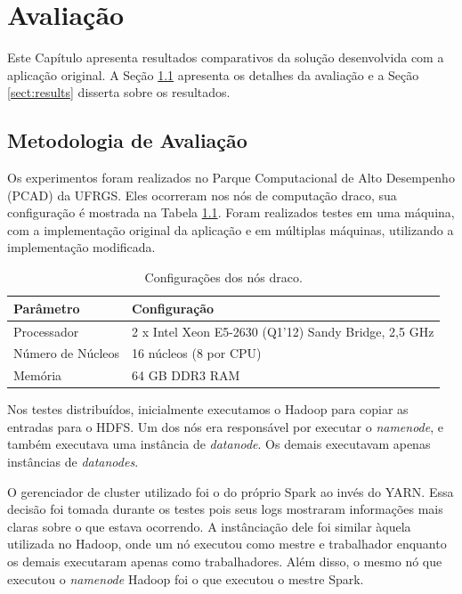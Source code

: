 \chapter{Avaliação} \label{ch:evaluation}

Este Capítulo apresenta resultados comparativos da solução desenvolvida com a 
aplicação original. A Seção \ref{sect:methodology} apresenta os detalhes da 
avaliação e a Seção \ref{sect:results} disserta sobre os resultados.


\section{Metodologia de Avaliação} \label{sect:methodology}

Os experimentos foram realizados no Parque Computacional de Alto 
Desempenho (PCAD) da UFRGS. Eles ocorreram nos nós de computação draco, sua 
configuração é mostrada na Tabela \ref{tab:draco_config}. Foram realizados 
testes em uma máquina, com a implementação original da aplicação e em múltiplas 
máquinas, utilizando a implementação modificada.

\begin{table}[H]
\centering
\begin{tabular}{l l} \toprule
\textbf{Parâmetro}  &  \textbf{Configuração} \\ 
\midrule
Processador     & 2 x Intel Xeon E5-2630 (Q1'12) Sandy Bridge, 2,5 GHz  
\\
Número de Núcleos    & 16 núcleos (8 por CPU)  \\
Memória       & 64 GB DDR3 RAM   \\
\end{tabular}
\caption{Configurações dos nós draco.}
\label{tab:draco_config}
\end{table}


Nos testes distribuídos, inicialmente executamos o Hadoop para copiar as 
entradas para o HDFS. Um dos nós era responsável por executar o \emph{namenode}, 
e também executava uma instância de \emph{datanode}. Os demais executavam apenas 
instâncias de \emph{datanodes}.

O gerenciador de cluster utilizado foi o do próprio Spark ao invés do YARN. 
Essa decisão foi tomada durante os testes pois seus logs mostraram 
informações mais claras sobre o que estava ocorrendo. A instânciação dele foi 
similar àquela utilizada no Hadoop, onde um nó executou como mestre e 
trabalhador enquanto os demais executaram apenas como trabalhadores. Além 
disso, o mesmo nó que executou o \emph{namenode} Hadoop foi o que executou o 
mestre Spark.

